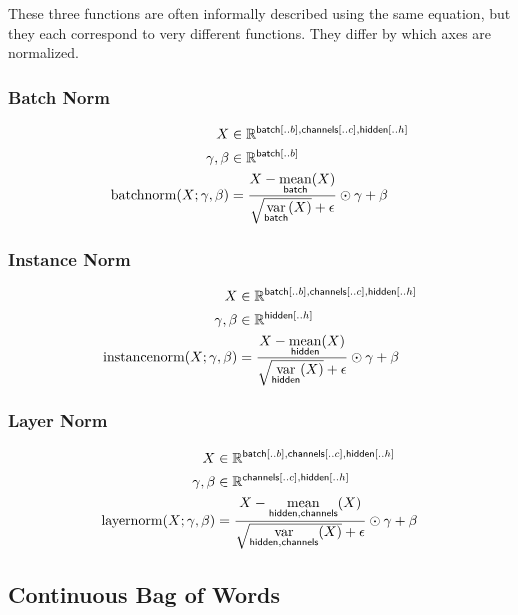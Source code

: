 \documentclass{article}
\newcommand{\reals}{\mathbb{R}}
\begin{document}
These three functions are often informally described using the same
equation, but they each correspond to very different functions. They differ
by which axes are normalized.

\subsubsection*{Batch Norm}

\begin{align*} 
X &\in \reals^{{\nset{batch}{..b}, \nset{channels}{..c}, \nset{hidden}{..h}}}\\
\gamma, \beta &\in \reals^{{\nset{batch}{..b}}} \\
\text{batchnorm}(X; \gamma, \beta) &= \frac{X - \nfun{batch}{mean}(X)}{\sqrt{\nfun{batch}{var}(X)} + \epsilon} \odot \gamma + \beta
\end{align*}


\subsubsection*{Instance Norm}

\begin{align*} 
X &\in \reals^{{\nset{batch}{..b}, \nset{channels}{..c}, \nset{hidden}{..h}}}\\
\gamma, \beta &\in \reals^{{\nset{hidden}{..h}}} \\
\text{instancenorm}(X; \gamma, \beta) &= \frac{X - \nfun{hidden}{\text{mean}}(X)}{\sqrt{\nfun{hidden}{\text{var}}(X)} + \epsilon} \odot \gamma + \beta
\end{align*}

\subsubsection*{Layer Norm}

\begin{align*} 
X &\in \reals^{{\nset{batch}{..b}, \nset{channels}{..c}, \nset{hidden}{..h}}} \\
\gamma, \beta &\in \reals^{{\nset{channels}{..c}, \nset{hidden}{..h}}} \\
\text{layernorm}(X; \gamma, \beta) &= \frac{X - \nfun{hidden,channels}{\text{mean}}(X)}{\sqrt{\nfun{hidden, channels}{\text{var}}(X)} + \epsilon} \odot \gamma + \beta 
\end{align*}


\subsection{Continuous Bag of Words}
\end{document}
